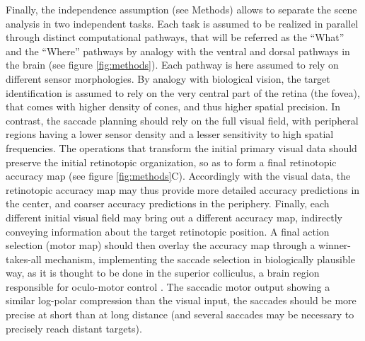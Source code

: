 Finally, the independence assumption (see Methods) allows to separate the scene analysis in two independent tasks. %
Each task is assumed to be realized in parallel through distinct computational pathways, that will be referred as the
``What'' and the ``Where'' pathways by analogy with the ventral and dorsal pathways in the brain (see figure \ref{fig:methods}).
Each pathway is here assumed to rely on different sensor morphologies. By analogy with biological vision, the target identification is assumed to rely on the very central part of the retina (the fovea), that comes with higher density of cones, and thus higher spatial precision. In contrast, the  saccade planning should rely on the full visual field, with peripheral regions having a lower sensor density and a lesser sensitivity to high spatial frequencies.
The operations that transform the initial primary visual data should preserve the initial retinotopic organization, so as to form a final retinotopic accuracy map (see figure \ref{fig:methods}C). Accordingly with the visual data, the retinotopic accuracy map may thus provide more detailed accuracy predictions in the center, and coarser accuracy predictions in the periphery.
Finally, each different initial visual field may bring out a different accuracy map, indirectly conveying information about the target retinotopic position.
A final action selection (motor map) should then overlay the accuracy map through a winner-takes-all mechanism, implementing the saccade selection in biologically plausible way, as it is thought to be done in the superior colliculus, a brain region responsible for oculo-motor control \cite{sparks1987sensory}.
The saccadic motor output showing a similar log-polar compression than the visual input, the saccades should be more precise at short than at long distance (and several saccades may be necessary to precisely reach distant targets).




